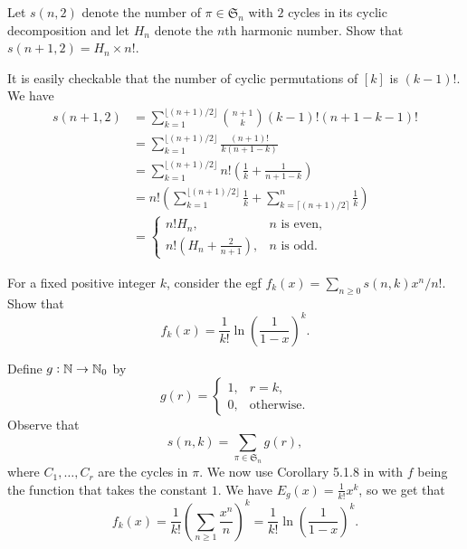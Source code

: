 		\begin{problem}
			Let $s(n,2)$ denote the number of $\pi \in \mathfrak{S}_n$ with $2$ cycles in its cyclic decomposition and let $H_n$ denote the $n$th harmonic number. Show that $s(n+1,2) = H_n \times n!$.
		\end{problem}
		\begin{solution*}
			It is easily checkable that the number of cyclic permutations of $[k]$ is $(k-1)!$. We have
			\begin{align*}
				s(n+1,2) &= \sum_{k=1}^{\lfloor (n+1)/2 \rfloor} \binom{n+1}{k} (k-1)! (n+1-k-1)! \\
					&= \sum_{k=1}^{\lfloor (n+1)/2 \rfloor} \frac{(n+1)!}{k(n+1-k)} \\
					&= \sum_{k=1}^{\lfloor (n+1)/2 \rfloor} n! \left( \frac{1}{k} + \frac{1}{n+1-k} \right) \\
					&= n! \left(\sum_{k=1}^{\lfloor (n+1)/2 \rfloor} \frac{1}{k} + \sum_{k=\lceil (n+1)/2 \rceil}^{n} \frac{1}{k} \right) \\
					&= \begin{cases} n!H_n, & \text{$n$ is even}, \\ n! (H_n + \frac{2}{n+1}), & \text{$n$ is odd.} \end{cases} 
			\end{align*}
		\end{solution*}

		\begin{problem}
			For a fixed positive integer $k$, consider the egf $f_k(x) = \sum_{n \ge 0} s(n,k) x^n/n!$. Show that
			\[ f_k(x) = \frac{1}{k!} \ln\left( \frac{1}{1-x} \right)^k. \]
		\end{problem}
		\begin{solution*}
			Define $g : \mathbb{N} \to \mathbb{N}_0$ by
			\[ g(r) = \begin{cases} 1, & r = k, \\ 0, & \text{otherwise.} \end{cases} \]
			Observe that
			\[ s(n,k) = \sum_{\pi \in \mathfrak{S}_n} g(r), \]
			where $C_1,\ldots,C_r$ are the cycles in $\pi$. We now use Corollary 5.1.8 in \cite{ec2} with $f$ being the function that takes the constant $1$. We have $E_g(x) = \frac{1}{k!} x^k$, so we get that
			\[ f_k(x) = \frac{1}{k!} \left( \sum_{n \ge 1} \frac{x^n}{n} \right)^k = \frac{1}{k!} \ln \left( \frac{1}{1-x} \right)^k. \]
		\end{solution*}

